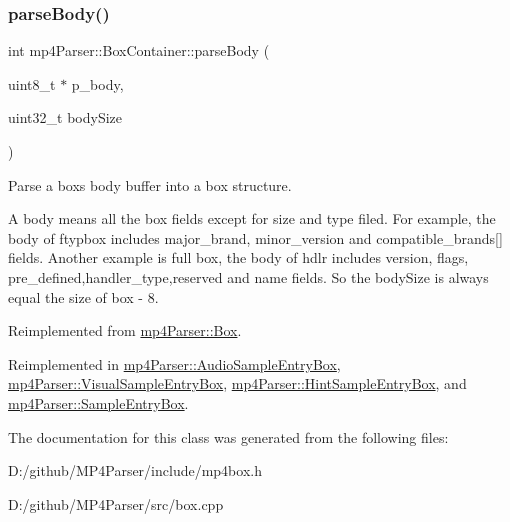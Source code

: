 \subsubsection{\texorpdfstring{parseBody()}{parseBody()}}
{\footnotesize\ttfamily int mp4\+Parser\+::\+Box\+Container\+::parse\+Body (\begin{DoxyParamCaption}\item[{uint8\+\_\+t $\ast$}]{p\+\_\+body,  }\item[{uint32\+\_\+t}]{body\+Size }\end{DoxyParamCaption})\hspace{0.3cm}{\ttfamily [virtual]}}



Parse a box\textquotesingle{}s body buffer into a box structure. 

A body means all the box fields except for size and type filed. For example, the body of ftypbox includes major\+\_\+brand, minor\+\_\+version and compatible\+\_\+brands\mbox{[}\mbox{]} fields. Another example is full box, the body of hdlr includes version, flags, pre\+\_\+defined,handler\+\_\+type,reserved and name fields. So the body\+Size is always equal the size of box -\/ 8. 

Reimplemented from \mbox{\hyperlink{classmp4_parser_1_1_box_a3dd0c084ac65bc77b69ac5ecaf796cb2}{mp4\+Parser\+::\+Box}}.



Reimplemented in \mbox{\hyperlink{classmp4_parser_1_1_audio_sample_entry_box_ab65dfb4aee59ecd374567ceafe58de4f}{mp4\+Parser\+::\+Audio\+Sample\+Entry\+Box}}, \mbox{\hyperlink{classmp4_parser_1_1_visual_sample_entry_box_a336c8d02232f769e50dcbd4c031bf274}{mp4\+Parser\+::\+Visual\+Sample\+Entry\+Box}}, \mbox{\hyperlink{classmp4_parser_1_1_hint_sample_entry_box_aa9a7e41f4bd9773fe31b867743d93d8f}{mp4\+Parser\+::\+Hint\+Sample\+Entry\+Box}}, and \mbox{\hyperlink{classmp4_parser_1_1_sample_entry_box_a8ff77bc115eb18deee12619ebfc0eaa6}{mp4\+Parser\+::\+Sample\+Entry\+Box}}.



The documentation for this class was generated from the following files\+:\begin{DoxyCompactItemize}
\item 
D\+:/github/\+M\+P4\+Parser/include/mp4box.\+h\item 
D\+:/github/\+M\+P4\+Parser/src/box.\+cpp\end{DoxyCompactItemize}
